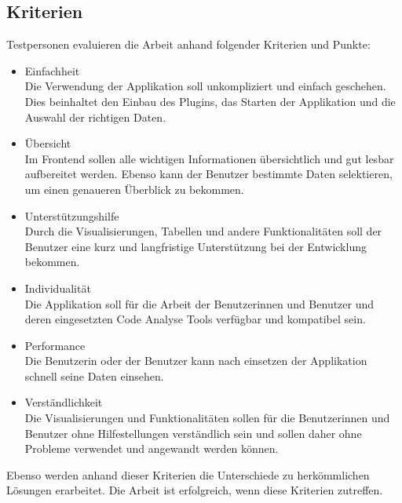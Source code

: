 \subsection{Kriterien} 
Testpersonen evaluieren die Arbeit anhand folgender Kriterien und Punkte:
\begin{itemize}
\item Einfachheit \\ Die Verwendung der Applikation soll unkompliziert und einfach geschehen. Dies beinhaltet den Einbau des Plugins, das Starten der Applikation und die Auswahl der richtigen Daten.
\item Übersicht \\ Im Frontend sollen alle wichtigen Informationen übersichtlich und gut lesbar aufbereitet werden. Ebenso kann der Benutzer bestimmte Daten selektieren, um einen genaueren Überblick zu bekommen.
\item Unterstützungshilfe \\ Durch die Visualisierungen, Tabellen und andere Funktionalitäten soll der Benutzer eine kurz und langfristige Unterstützung bei der Entwicklung bekommen.
\item Individualität \\ Die Applikation soll für die Arbeit der Benutzerinnen und Benutzer und deren eingesetzten Code Analyse Tools verfügbar und kompatibel sein. 
\item Performance \\ Die Benutzerin oder der Benutzer kann nach einsetzen der Applikation schnell seine Daten einsehen.
\item Verständlichkeit \\ Die Visualisierungen und Funktionalitäten sollen für die Benutzerinnen und Benutzer ohne Hilfestellungen verständlich sein und sollen daher ohne Probleme verwendet und angewandt werden können.
\end{itemize}

Ebenso werden anhand dieser Kriterien die Unterschiede zu herkömmlichen Lösungen erarbeitet. Die Arbeit ist erfolgreich, wenn diese Kriterien zutreffen. 

